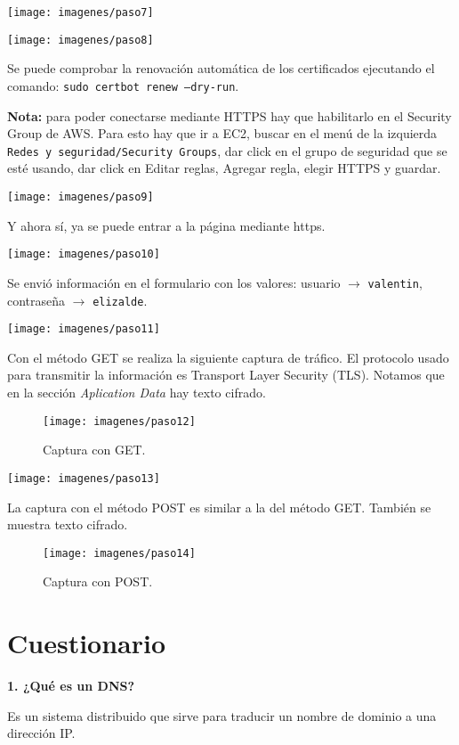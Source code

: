 \documentclass{article}
\begin{document}
\texttt{[image: imagenes/paso7]}

\texttt{[image: imagenes/paso8]}

Se puede comprobar la renovación automática de los certificados ejecutando el comando: \texttt{sudo certbot renew --dry-run}.

\textbf{Nota:} para poder conectarse mediante HTTPS hay que habilitarlo en el Security Group de AWS. Para esto hay que ir a EC2, buscar en el menú de la izquierda \texttt{Redes y seguridad/Security Groups}, dar click en el grupo de seguridad que se esté usando, dar click en Editar reglas, Agregar regla, elegir HTTPS y guardar.

\texttt{[image: imagenes/paso9]}

Y ahora sí, ya se puede entrar a la página mediante https.

\texttt{[image: imagenes/paso10]}

Se envió información en el formulario con los valores: usuario $\rightarrow$ \texttt{valentin}, contraseña $\rightarrow$ \texttt{elizalde}.

\texttt{[image: imagenes/paso11]}

Con el método GET se realiza la siguiente captura de tráfico. El protocolo usado para transmitir la información es Transport Layer Security (TLS). Notamos que en la sección \textit{Aplication Data} hay texto cifrado.

\begin{figure}
\texttt{[image: imagenes/paso12]}
\caption{Captura con GET.}
\label{captura1}
\end{figure}

\texttt{[image: imagenes/paso13]}

La captura con el método POST es similar a la del método GET. También se muestra texto cifrado.

\begin{figure}
\texttt{[image: imagenes/paso14]}
\caption{Captura con POST.}
\label{captura2}
\end{figure}

\section{Cuestionario}

\textbf{1. ¿Qué es un DNS?}

Es un sistema distribuido que sirve para traducir un nombre de dominio a una dirección IP.\\
\end{document}
